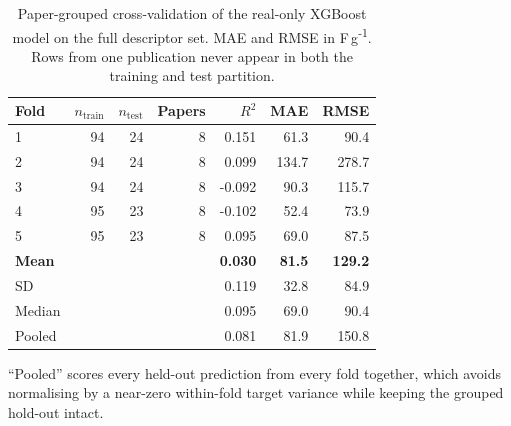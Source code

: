 \begin{table}[htbp]
\centering
\caption{Paper-grouped cross-validation of the real-only XGBoost model on the full descriptor set. MAE and RMSE in F\,g\textsuperscript{-1}. Rows from one publication never appear in both the training and test partition.}
\label{tab:grouped}
\footnotesize
\begin{tabular}{lrrrrrr}
\toprule
\textbf{Fold} & \textbf{$n_{\mathrm{train}}$} & \textbf{$n_{\mathrm{test}}$} & \textbf{Papers} & \textbf{$R^2$} & \textbf{MAE} & \textbf{RMSE} \\
\midrule
1 & 94 & 24 & 8 & 0.151 & 61.3 & 90.4 \\
2 & 94 & 24 & 8 & 0.099 & 134.7 & 278.7 \\
3 & 94 & 24 & 8 & -0.092 & 90.3 & 115.7 \\
4 & 95 & 23 & 8 & -0.102 & 52.4 & 73.9 \\
5 & 95 & 23 & 8 & 0.095 & 69.0 & 87.5 \\
\midrule \textbf{Mean} &  &  &  & \textbf{0.030} & \textbf{81.5} & \textbf{129.2} \\
SD &  &  &  & 0.119 & 32.8 & 84.9 \\
Median &  &  &  & 0.095 & 69.0 & 90.4 \\
Pooled &  &  &  & 0.081 & 81.9 & 150.8 \\
\bottomrule
\end{tabular}
\par\vspace{2pt}\begin{minipage}{\linewidth}\scriptsize ``Pooled'' scores every held-out prediction from every fold together, which avoids normalising by a near-zero within-fold target variance while keeping the grouped hold-out intact.\end{minipage}
\end{table}
